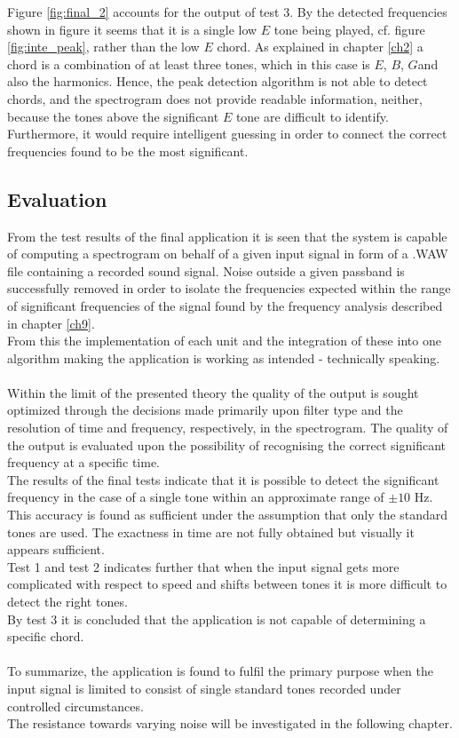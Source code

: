 Figure \ref{fig:final_2} accounts for the output of test 3. By the detected frequencies shown in figure \label{fig:final_peak2} it seems that it is a single low $E$ tone being played, cf. figure \ref{fig:inte_peak}, rather than the low $E$ chord. As explained in chapter \ref{ch2} a chord is a combination of at least three tones, which in this case is $E$, $B$, $G$\hashsharp and also the harmonics. Hence, the peak detection algorithm is not able to detect chords, and the spectrogram does not provide readable information, neither, because the tones above the significant $E$ tone are difficult to identify. Furthermore, it would require intelligent guessing in order to connect the correct frequencies found to be the most significant. 

\subsection{Evaluation}
From the test results of the final application it is seen that the system is capable of computing a spectrogram on behalf of a given input signal in form of a .WAW file containing a recorded sound signal. Noise outside a given passband is successfully removed in order to isolate the frequencies expected within the range of significant frequencies of the signal found by the frequency analysis described in chapter \ref{ch9}. \\
From this the implementation of each unit and the integration of these into one algorithm making the application is working as intended - technically speaking. \\
\\
Within the limit of the presented theory the quality of the output is sought optimized through the decisions made primarily upon filter type and the resolution of time and frequency, respectively, in the spectrogram.
The quality of the output is evaluated upon the possibility of recognising the correct significant frequency at a specific time. \\
The results of the final tests indicate that it is possible to detect the significant frequency in the case of a single tone within an approximate range of $\pm 10$ Hz. This accuracy is found as sufficient under the assumption that only the standard tones are used. The exactness in time are not fully obtained but visually it appears sufficient. \\        
Test 1 and test 2 indicates further that when the input signal gets more complicated with respect to speed and shifts between tones it is more difficult to detect the right tones. \\
By test 3 it is concluded that the application is not capable of determining a specific chord. \\   
\\
To summarize, the application is found to fulfil the primary purpose when the input signal is limited to consist of single standard tones recorded under controlled circumstances. \\
The resistance towards varying noise will be investigated in the following chapter.           